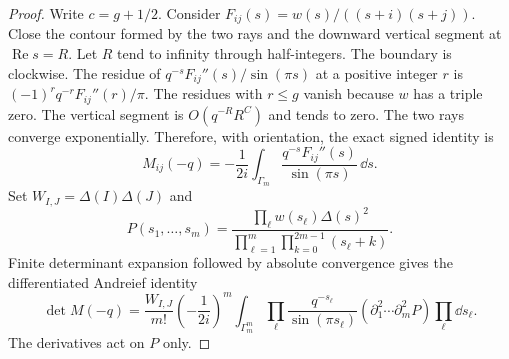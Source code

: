 \begin{proof}
Write $c=g+1/2$. Consider
$F_{ij}(s)=w(s)/((s+i)(s+j))$. Close the contour formed by the two rays
and the downward vertical segment at $\operatorname{Re} s=R$. Let $R$ tend
to infinity through half-integers. The boundary is clockwise. The residue of
$q^{-s}F_{ij}''(s)/\sin(\pi s)$ at a positive integer $r$ is
$(-1)^rq^{-r}F_{ij}''(r)/\pi$. The residues with $r\le g$ vanish because
$w$ has a triple zero. The vertical segment is $O(q^{-R}R^C)$ and tends to
zero. The two rays converge exponentially. Therefore, with orientation,
the exact signed identity is
\begin{equation}
 M_{ij}(-q)=-\frac1{2i}\int_{\Gamma_m}
       \frac{q^{-s}F_{ij}''(s)}{\sin(\pi s)}\,\dd s.         \label{eq:30}
\end{equation}
Set $W_{I,J}=\Delta(I)\Delta(J)$ and
\[
 P(s_1,\ldots,s_m)=
 \frac{\prod_\ell w(s_\ell)\Delta(s)^2}
 {\prod_{\ell=1}^{m}\prod_{k=0}^{2m-1}(s_\ell+k)}.
\]
Finite determinant expansion followed by absolute convergence gives the
differentiated Andreief identity
\begin{equation}
 \det M(-q)=\frac{W_{I,J}}{m!}\left(-\frac1{2i}\right)^m
 \int_{\Gamma_m^m}\prod_\ell\frac{q^{-s_\ell}}{\sin(\pi s_\ell)}
 \left(\partial_1^2\cdots\partial_m^2P\right)
 \prod_\ell\dd s_\ell.                                   \label{eq:31}
\end{equation}
The derivatives act on $P$ only.


\end{proof}
